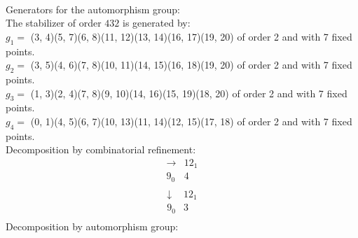 \\
Generators for the automorphism group: \\
The stabilizer of order $432$ is generated by:\\
$g_{1} = $ (3, 4)(5, 7)(6, 8)(11, 12)(13, 14)(16, 17)(19, 20) of order 2 and with 7 fixed points.\\
$g_{2} = $ (3, 5)(4, 6)(7, 8)(10, 11)(14, 15)(16, 18)(19, 20) of order 2 and with 7 fixed points.\\
$g_{3} = $ (1, 3)(2, 4)(7, 8)(9, 10)(14, 16)(15, 19)(18, 20) of order 2 and with 7 fixed points.\\
$g_{4} = $ (0, 1)(4, 5)(6, 7)(10, 13)(11, 14)(12, 15)(17, 18) of order 2 and with 7 fixed points.\\

\bigskip
Decomposition by combinatorial refinement:\\
$$
\begin{array}{r|*{1}{r}}
\rightarrow  &     12_{  1}\\
\hline
     9_{  0} &            4\\
\end{array}
$$
$$
\begin{array}{r|*{1}{r}}
\downarrow  &     12_{  1}\\
\hline
     9_{  0} &            3\\
\end{array}
$$
Decomposition by automorphism group:\\
